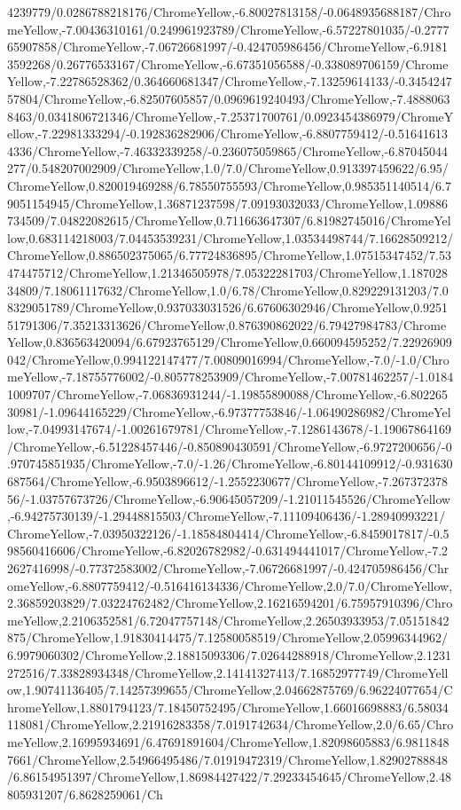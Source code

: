 {\begin{tikzternal}
4239779/0.0286788218176/ChromeYellow,-6.80027813158/-0.0648935688187/ChromeYellow,-7.00436310161/0.249961923789/ChromeYellow,-6.57227801035/-0.277765907858/ChromeYellow,-7.06726681997/-0.424705986456/ChromeYellow,-6.91813592268/0.26776533167/ChromeYellow,-6.67351056588/-0.338089706159/ChromeYellow,-7.22786528362/0.364660681347/ChromeYellow,-7.13259614133/-0.345424757804/ChromeYellow,-6.82507605857/0.0969619240493/ChromeYellow,-7.48880638463/0.0341806721346/ChromeYellow,-7.25371700761/0.0923454386979/ChromeYellow,-7.22981333294/-0.192836282906/ChromeYellow,-6.8807759412/-0.516416134336/ChromeYellow,-7.46332339258/-0.236075059865/ChromeYellow,-6.87045044277/0.548207002909/ChromeYellow,1.0/7.0/ChromeYellow,0.913397459622/6.95/ChromeYellow,0.820019469288/6.78550755593/ChromeYellow,0.985351140514/6.79051154945/ChromeYellow,1.36871237598/7.09193032033/ChromeYellow,1.09886734509/7.04822082615/ChromeYellow,0.711663647307/6.81982745016/ChromeYellow,0.683114218003/7.04453539231/ChromeYellow,1.03534498744/7.16628509212/ChromeYellow,0.886502375065/6.77724836895/ChromeYellow,1.07515347452/7.53474475712/ChromeYellow,1.21346505978/7.05322281703/ChromeYellow,1.18702834809/7.18061117632/ChromeYellow,1.0/6.78/ChromeYellow,0.829229131203/7.08329051789/ChromeYellow,0.937033031526/6.67606302946/ChromeYellow,0.925151791306/7.35213313626/ChromeYellow,0.876390862022/6.79427984783/ChromeYellow,0.836563420094/6.67923765129/ChromeYellow,0.660094595252/7.22926909042/ChromeYellow,0.994122147477/7.00809016994/ChromeYellow,-7.0/-1.0/ChromeYellow,-7.18755776002/-0.805778253909/ChromeYellow,-7.00781462257/-1.01841009707/ChromeYellow,-7.06836931244/-1.19855890088/ChromeYellow,-6.80226530981/-1.09644165229/ChromeYellow,-6.97377753846/-1.06490286982/ChromeYellow,-7.04993147674/-1.00261679781/ChromeYellow,-7.1286143678/-1.19067864169/ChromeYellow,-6.51228457446/-0.850890430591/ChromeYellow,-6.9727200656/-0.970745851935/ChromeYellow,-7.0/-1.26/ChromeYellow,-6.80144109912/-0.931630687564/ChromeYellow,-6.9503896612/-1.2552230677/ChromeYellow,-7.26737237856/-1.03757673726/ChromeYellow,-6.90645057209/-1.21011545526/ChromeYellow,-6.94275730139/-1.29448815503/ChromeYellow,-7.11109406436/-1.28940993221/ChromeYellow,-7.03950322126/-1.18584804414/ChromeYellow,-6.8459017817/-0.598560416606/ChromeYellow,-6.82026782982/-0.631494441017/ChromeYellow,-7.22627416998/-0.77372583002/ChromeYellow,-7.06726681997/-0.424705986456/ChromeYellow,-6.8807759412/-0.516416134336/ChromeYellow,2.0/7.0/ChromeYellow,2.36859203829/7.03224762482/ChromeYellow,2.16216594201/6.75957910396/ChromeYellow,2.2106352581/6.72047757148/ChromeYellow,2.26503933953/7.05151842875/ChromeYellow,1.91830414475/7.12580058519/ChromeYellow,2.05996344962/6.9979060302/ChromeYellow,2.18815093306/7.02644288918/ChromeYellow,2.1231272516/7.33828934348/ChromeYellow,2.14141327413/7.16852977749/ChromeYellow,1.90741136405/7.14257399655/ChromeYellow,2.04662875769/6.96224077654/ChromeYellow,1.8801794123/7.18450752495/ChromeYellow,1.66016698883/6.58034118081/ChromeYellow,2.21916283358/7.0191742634/ChromeYellow,2.0/6.65/ChromeYellow,2.16995934691/6.47691891604/ChromeYellow,1.82098605883/6.98118487661/ChromeYellow,2.54966495486/7.01919472319/ChromeYellow,1.82902788848/6.86154951397/ChromeYellow,1.86984427422/7.29233454645/ChromeYellow,2.48805931207/6.8628259061/Ch
\end{tikzternal}}
